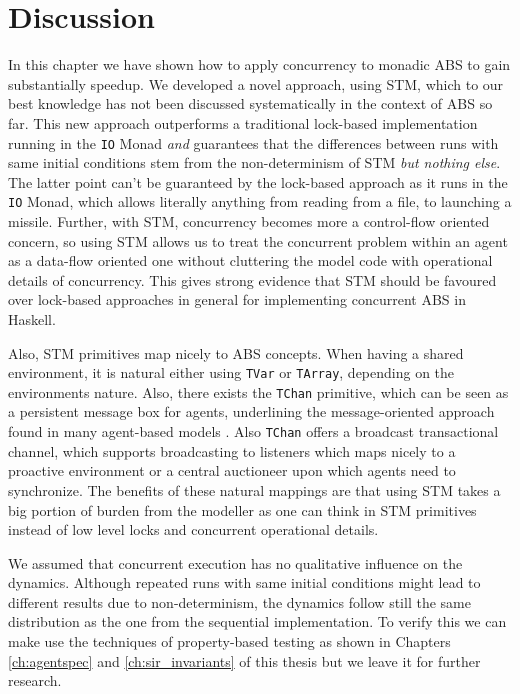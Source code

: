 \section{Discussion}
In this chapter we have shown how to apply concurrency to monadic ABS to gain substantially speedup. We developed a novel approach, using STM, which to our best knowledge has not been discussed systematically in the context of ABS so far. This new approach outperforms a traditional lock-based implementation running in the \texttt{IO} Monad \textit{and} guarantees that the differences between runs with same initial conditions stem from the non-determinism of STM \textit{but nothing else}. The latter point can't be guaranteed by the lock-based approach as it runs in the \texttt{IO} Monad, which allows literally anything from reading from a file, to launching a missile. Further, with STM, concurrency becomes more a control-flow oriented concern, so using STM allows us to treat the concurrent problem within an agent as a data-flow oriented one without cluttering the model code with operational details of concurrency. This gives strong evidence that STM should be favoured over lock-based approaches in general for implementing concurrent ABS in Haskell.

Also, STM primitives map nicely to ABS concepts. When having a shared environment, it is natural either using \texttt{TVar} or \texttt{TArray}, depending on the environments nature. Also, there exists the \texttt{TChan} primitive, which can be seen as a persistent message box for agents, underlining the message-oriented approach found in many agent-based models \cite{agha_actors:_1986, wooldridge_introduction_2009}. Also \texttt{TChan} offers a broadcast transactional channel, which supports broadcasting to listeners which maps nicely to a proactive environment or a central auctioneer upon which agents need to synchronize. The benefits of these natural mappings are that using STM takes a big portion of burden from the modeller as one can think in STM primitives instead of low level locks and concurrent operational details. 

We assumed that concurrent execution has no qualitative influence on the dynamics. Although repeated runs with same initial conditions might lead to different results due to non-determinism, the dynamics follow still the same distribution as the one from the sequential implementation. To verify this we can make use the techniques of property-based testing as shown in Chapters \ref{ch:agentspec} and \ref{ch:sir_invariants} of this thesis but we leave it for further research.

